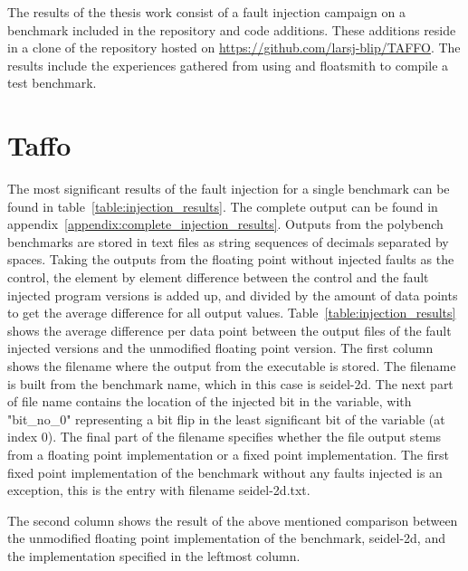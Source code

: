 
The results of the thesis work consist of a fault injection campaign on a benchmark included in the \taffo{} repository and code additions. These additions reside in a clone of the \taffo{} repository hosted on \href{https://github.com/larsj-blip/TAFFO}{https://github.com/larsj-blip/TAFFO}. The results include the experiences gathered from using \taffo{} and floatsmith to compile a test benchmark.


\section{Taffo}
The most significant results of the fault injection for a single benchmark can be found in table~\ref{table:injection_results}. The complete output can be found in appendix~\ref{appendix:complete_injection_results}. Outputs from the polybench benchmarks are stored in text files as string sequences of decimals separated by spaces. Taking the outputs from the floating point without injected faults as the control, the element by element difference between the control and the fault injected program versions is added up, and divided by the amount of data points to get the average difference for all output values. Table~\ref{table:injection_results} shows the average difference per data point between the output files of the fault injected versions and the unmodified floating point version.   
The first column shows the filename where the output from the executable is stored. The filename is built from the benchmark name, which in this case is seidel-2d. The next part of file name contains the location of the injected bit in the variable, with "bit\_no\_0" representing a bit flip in the least significant bit of the variable (at index 0). The final part of the filename specifies whether the file output stems from a floating point implementation or a fixed point implementation.
The first fixed point implementation of the benchmark without any faults injected is an exception, this is the entry with filename seidel-2d.txt.

The second column shows the result of the above mentioned comparison between the unmodified floating point implementation of the benchmark, seidel-2d, and the implementation specified in the leftmost column. 



